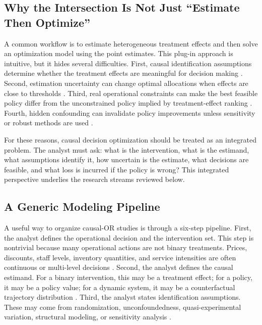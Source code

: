 \documentclass[11pt]{article}
\begin{document}
\subsection{Why the Intersection Is Not Just ``Estimate Then Optimize''}

A common workflow is to estimate heterogeneous treatment effects and then solve an optimization model using the point estimates. This plug-in approach is intuitive, but it hides several difficulties. First, causal identification assumptions determine whether the treatment effects are meaningful for decision making \citep{imbens2015causal,hernan2020causal}. Second, estimation uncertainty can change optimal allocations when effects are close to thresholds \citep{kitagawa2018treated,athey2021policy}. Third, real operational constraints can make the best feasible policy differ from the unconstrained policy implied by treatment-effect ranking \citep{bertsimas2020predictive}. Fourth, hidden confounding can invalidate policy improvements unless sensitivity or robust methods are used \citep{rosenbaum2002observational,kallus2018confounding}.

For these reasons, causal decision optimization should be treated as an integrated problem. The analyst must ask: what is the intervention, what is the estimand, what assumptions identify it, how uncertain is the estimate, what decisions are feasible, and what loss is incurred if the policy is wrong? This integrated perspective underlies the research streams reviewed below.

\subsection{A Generic Modeling Pipeline}

A useful way to organize causal-OR studies is through a six-step pipeline. First, the analyst defines the operational decision and the intervention set. This step is nontrivial because many operational actions are not binary treatments. Prices, discounts, staff levels, inventory quantities, and service intensities are often continuous or multi-level decisions \citep{gallego1994optimal,bertsimas2020predictive}. Second, the analyst defines the causal estimand. For a binary intervention, this may be a treatment effect; for a policy, it may be a policy value; for a dynamic system, it may be a counterfactual trajectory distribution \citep{murphy2003dynamic,hernan2020causal}. Third, the analyst states identification assumptions. These may come from randomization, unconfoundedness, quasi-experimental variation, structural modeling, or sensitivity analysis \citep{rosenbaum1983central,angrist2009mostly,pearl2009causality,rosenbaum2002observational}.
\end{document}

